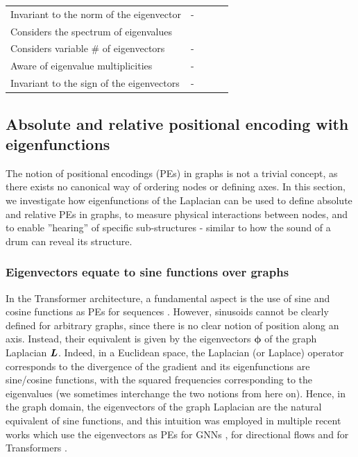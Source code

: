\documentclass{article}
\newcommand{\cmark}{\ding{51}}%
\newcommand{\xmark}{\ding{55}}%
\def\eigvec{{\bm{\phi}}}
\begin{document}
\begin{table}[h]
{\begin{tabular}{l|cccc}
Invariant to the norm of the eigenvector
& - & \cmark & \cmark & \cmark \\

Considers the spectrum of eigenvalues
& \xmark & \xmark & \xmark & \cmark \\

Considers variable \# of eigenvectors
& - & \xmark & \xmark & \cmark \\

Aware of eigenvalue multiplicities
& - & \xmark & \xmark & \cmark \\

Invariant to the sign of the eigenvectors
& - & \xmark & \xmark & \xmark

\end{tabular}}
\vspace{-5pt}
\end{table}




\subsection{Absolute and relative positional encoding with eigenfunctions}

The notion of positional encodings (PEs) in graphs is not a trivial concept, as there exists no canonical way of ordering nodes or defining axes. In this section, we investigate how eigenfunctions of the Laplacian can be used to define absolute and relative PEs in graphs, to measure physical interactions between nodes, and to enable ''hearing'' of specific sub-structures - similar to how the sound of a drum can reveal its structure.

\subsubsection{Eigenvectors equate to sine functions over graphs}

In the Transformer architecture, a fundamental aspect is the use of sine and cosine functions as PEs for sequences \cite{vaswani_2017_attention}.
However, sinusoids cannot be clearly defined for arbitrary graphs, since there is no clear notion of position along an axis. Instead, their equivalent is given by the eigenvectors $\eigvec$ of the graph Laplacian ${\bm{L}}$.
Indeed, in a Euclidean space, the Laplacian (or Laplace) operator corresponds to the divergence of the gradient and its eigenfunctions are sine/cosine functions, with the squared frequencies corresponding to the eigenvalues (we sometimes interchange the two notions from here on). 
Hence, in the graph domain, the eigenvectors of the graph Laplacian are the natural equivalent of sine functions, and this intuition was employed in multiple recent works which use the eigenvectors as PEs for GNNs \cite{dwivedi2020benchmarking}, for directional flows \cite{beaini_directional_2021} and for Transformers \cite{dwivedi2020generalization}. 
\end{document}
